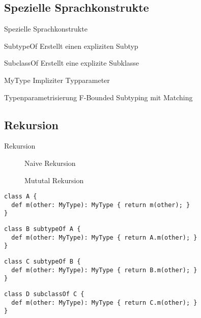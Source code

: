 \subsection{Spezielle Sprachkonstrukte}
\begin{frame}{Spezielle Sprachkonstrukte}
	\begin{bigdescription}[<+->]{3mm}
		\item[SubtypeOf] Erstellt einen expliziten Subtyp

		\item[SubclassOf] Erstellt eine explizite Subklasse

		\item[MyType] Impliziter Typparameter

		\item[Typenparametrisierung] F-Bounded Subtyping mit Matching
	\end{bigdescription}
\end{frame}

\subsection{Rekursion}
\begin{frame}[c]{Rekursion}
	\begin{figure}
		\caption{Naive Rekursion}
	\end{figure}
	\begin{figure}
		\caption{Mututal Rekursion}
	\end{figure}
\end{frame}

\begin{frame}[c,fragile]
\begin{lstlisting}[language=ooplss]
class A {
  def m(other: MyType): MyType { return m(other); }
}
\end{lstlisting}
\pause
\begin{lstlisting}[language=ooplss]
class B subtypeOf A {
  def m(other: MyType): MyType { return A.m(other); }
}
\end{lstlisting}
\pause
\begin{lstlisting}[language=ooplss]
class C subtypeOf B {
  def m(other: MyType): MyType { return B.m(other); }
}
\end{lstlisting}
\pause
\begin{lstlisting}[language=ooplss]
class D subclassOf C {
  def m(other: MyType): MyType { return C.m(other); }
}
\end{lstlisting}
\end{frame}

